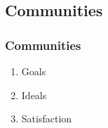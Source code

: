 \subsection{Communities}
\begin{frame}\frametitle{Communities}
    \begin{enumerate}
        \item Goals
        \item Ideals
        \item Satisfaction
    \end{enumerate}
\end{frame}